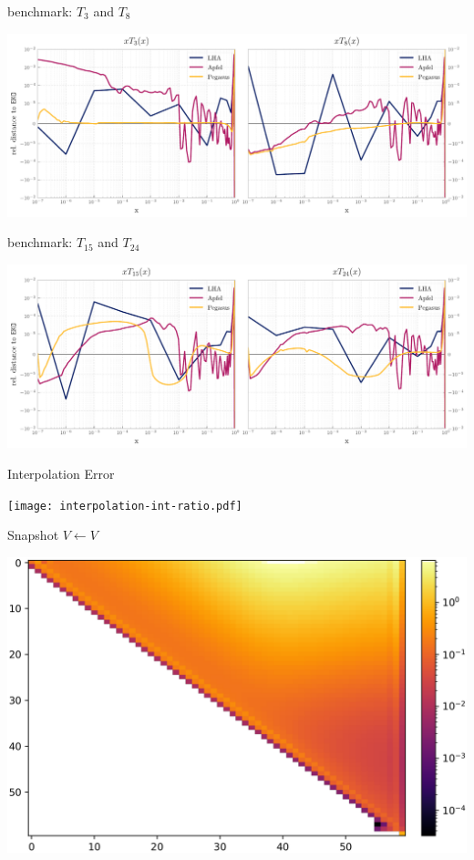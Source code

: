 \documentclass[9pt]{beamer}
\begin{document}
\begin{frame}{\eko{} \lha{} benchmark: $T_3$ and $T_8$}
	\begin{center}
		\includegraphics[width=\linewidth]{lha_bench_T3_T8.pdf}
	\end{center}
\end{frame}
\begin{frame}{\eko{} \lha{} benchmark: $T_{15}$ and $T_{24}$}
	\begin{center}
		\includegraphics[width=\linewidth]{lha_bench_T15_T24.pdf}
	\end{center}
\end{frame}
\begin{frame}{\eko{} Interpolation Error}
	\begin{center}
		\texttt{[image: interpolation-int-ratio.pdf]}
	\end{center}
\end{frame}
\begin{frame}{\eko{} Snapshot $V\leftarrow V$}
	\begin{center}
		\includegraphics[width=\linewidth]{VvV.png}
	\end{center}
\end{frame}
\end{document}
